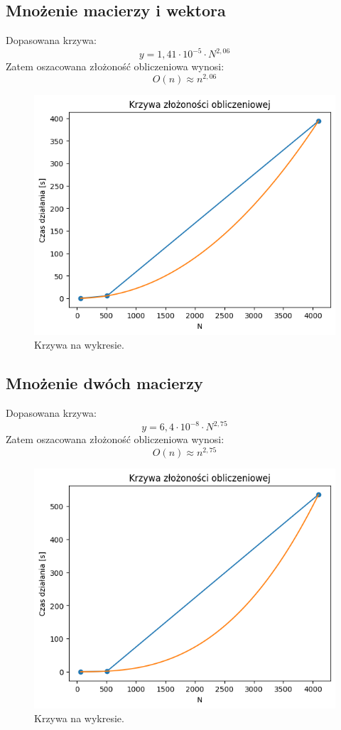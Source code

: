 \documentclass[11pt, leqno]{scrartcl}
\begin{document}
    \subsection{Mnożenie macierzy i wektora}
    Dopasowana krzywa:
    \[
        y=1,41 \cdot 10^{-5} \cdot N^{2,06}
    \]
    Zatem oszacowana złożoność obliczeniowa wynosi:
    \[
        O(n) \approx n^{2,06}
    \]
    \begin{figure}[H]
        \centering
        \includegraphics[width=0.7\linewidth]{matrix_vector_comp.png}
        \caption{Krzywa na wykresie.}
    \end{figure}

    \subsection{Mnożenie dwóch macierzy}
    Dopasowana krzywa:
    \[
        y=6,4 \cdot 10^{-8} \cdot N^{2,75}
    \]
    Zatem oszacowana złożoność obliczeniowa wynosi:
    \[
        O(n) \approx n^{2,75}
    \]
    \begin{figure}[H]
        \centering
        \includegraphics[width=0.7\linewidth]{matrix_matrix_comp.png}
        \caption{Krzywa na wykresie.}
    \end{figure}
\end{document}
